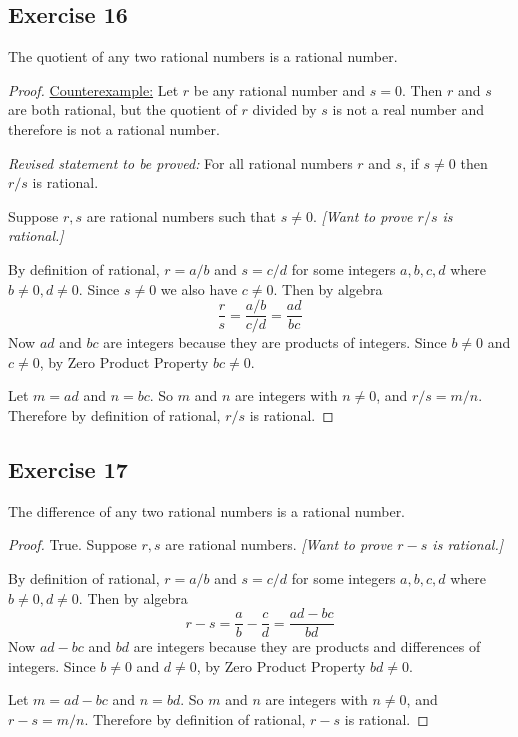 \documentclass[14pt]{extarticle}
\begin{document}
\subsection{Exercise 16}
The quotient of any two rational numbers is a rational number.

\begin{proof}
\underline{Counterexample:} Let $r$ be any rational number and $s = 0$. Then $r$ and $s$ are both rational, but the quotient of $r$ divided by $s$ is not a real number and therefore is not a rational number.

{\it Revised statement to be proved:} For all rational numbers $r$ and $s$, if $s \neq 0$ then $r/s$ is rational.

Suppose $r,s$ are rational numbers such that $s \neq 0$. {\it[Want to prove $r/s$ is rational.]}

By definition of rational, $r = a/b$ and $s = c/d$ for some integers $a,b,c,d$ where $b \neq 0, d \neq 0$. Since $s \neq 0$ we also have $c \neq 0$. Then by algebra
\[
\frac{r}{s} = \frac{a/b}{c/d} = \frac{ad}{bc}
\]
Now $ad$ and $bc$ are integers because they are products of integers. Since $b \neq 0$ and $c \neq 0$, by Zero Product Property $bc \neq 0$. 

Let $m = ad$ and $n = bc$. So $m$ and $n$ are integers with $n \neq 0$, and $r / s = m / n$. Therefore by definition of rational, $r/s$ is rational.
\end{proof}

\subsection{Exercise 17}
The difference of any two rational numbers is a rational number.

\begin{proof}
True. Suppose $r,s$ are rational numbers. {\it[Want to prove $r-s$ is rational.]}

By definition of rational, $r = a/b$ and $s = c/d$ for some integers $a,b,c,d$ where $b \neq 0, d \neq 0$. Then by algebra
\[
r-s = \frac{a}{b}-\frac{c}{d} = \frac{ad-bc}{bd}
\]
Now $ad-bc$ and $bd$ are integers because they are products and differences of integers. Since $b \neq 0$ and $d \neq 0$, by Zero Product Property $bd \neq 0$. 

Let $m = ad-bc$ and $n = bd$. So $m$ and $n$ are integers with $n \neq 0$, and $r - s = m / n$. Therefore by definition of rational, $r-s$ is rational.
\end{proof}
\end{document}
